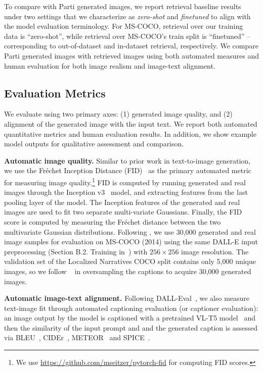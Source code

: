 To compare with Parti generated images, we report retrieval baseline results under two settings that we characterize as \textit{zero-shot} and \textit{finetuned} to align with the model evaluation terminology. For MS-COCO, retrieval over our training data is ``zero-shot'', while retrieval over MS-COCO's train split is ``finetuned'' -- corresponding to out-of-dataset and in-dataset retrieval, respectively. We compare Parti generated images with retrieved images using both automated measures and human evaluation for both image realism and image-text alignment.

\subsection{Evaluation Metrics}

We evaluate using two primary axes: (1) generated image quality, and (2) alignment of the generated image with the input text. We report both automated quantitative metrics and human evaluation results. In addition, we show example model outputs for qualitative assessment and comparison.

\textbf{Automatic image quality.} Similar to prior work in text-to-image generation, we use the Fr\'echet Inception Distance (FID)~\cite{heusel2017gans} as the primary automated metric for measuring image quality.\footnote{We use \url{https://github.com/mseitzer/pytorch-fid} for computing FID scores.} FID is computed by running generated and real images through the Inception v3~\cite{szegedy2016rethinking} model, and extracting features from the last pooling layer of the model. The Inception features of the generated and real images are used to fit two separate multi-variate Gaussians. Finally, the FID score is computed by measuring the Fr\'echet distance between the two multivariate Gaussian distributions. Following \cite{Xu18,zhang2021cross,ramesh2021zero}, we use 30,000 generated and real image samples for evaluation on MS-COCO (2014) using the same DALL-E input preprocessing (Section B.2. Training in~\cite{ramesh2021zero}) with \(256{\times}256\) image resolution. The validation set of the Localized Narratives COCO split contains only 5,000 unique images, so we follow ~\cite{zhang2021cross} in oversampling the captions to acquire 30,000 generated images.

\textbf{Automatic image-text alignment.} Following DALL-Eval~\cite{Cho2022DallEval}, we also measure text-image fit through automated captioning evaluation (or captioner evaluation): an image output by the model is captioned with a pretrained VL-T5 model~\cite{cho2021vlt5} and then the similarity of the input prompt and and the generated caption is assessed via BLEU~\cite{Papineni2002}, CIDEr~\cite{Vedantam2015}, METEOR~\cite{denkowski2014} and SPICE~\cite{spice2016}.  

